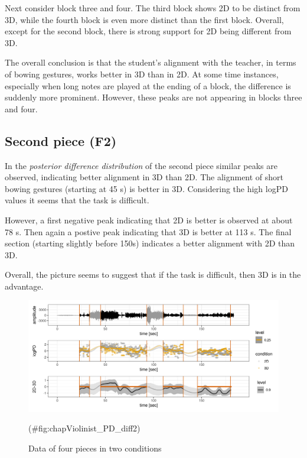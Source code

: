 \documentclass[
]{book}
\theoremstyle{definition}
\theoremstyle{definition}
\theoremstyle{definition}
\theoremstyle{definition}
\theoremstyle{remark}
\begin{document}
Next consider block three and four.
The third block shows 2D to be distinct from 3D, while the fourth block is even more distinct than the first block.
Overall, except for the second block, there is strong support for 2D being different from 3D.

The overall conclusion is that the student's alignment with the teacher, in terms of bowing gestures, works better in 3D than in 2D. At some time instances, especially when long notes are played at the ending of a block, the difference is suddenly more prominent. However, these peaks are not appearing in blocks three and four.

\hypertarget{second-piece-f2}{%
\subsection{Second piece (F2)}\label{second-piece-f2}}

In the \emph{posterior difference distribution} of the second piece
similar peaks are observed, indicating better alignment in 3D than 2D.
The alignment of short bowing gestures (starting at 45 s) is better in 3D.
Considering the high logPD values it seems that the task is difficult.

However, a first negative peak indicating that 2D is better is observed at
about 78 s. Then again a postive peak indicating that 3D is better at 113 s.
The final section (starting slightly before 150s) indicates a better alignment with 2D than 3D.

Overall, the picture seems to suggest that if the task is difficult, then 3D is in the advantage.

\begin{figure}

{\centering \includegraphics[width=1\linewidth]{Figures/chapViolinist_Diff_model_F2} 

}

\caption{Data of four pieces in two conditions}(\#fig:chapViolinist_PD_diff2)
\end{figure}
\end{document}
